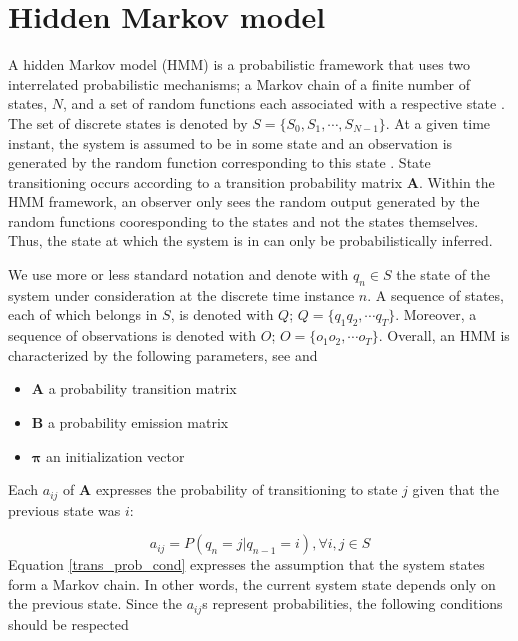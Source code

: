 \section{Hidden Markov model}
\label{hmm_general}

A hidden Markov model (HMM) is a probabilistic framework that uses two interrelated probabilistic mechanisms; a Markov chain of a finite
number of states, $N$, and a set of random functions each associated with a respective state \cite{koski}.  The set of discrete states is denoted by $S=\{S_0, S_1,\cdots, S_{N-1}\}$. At a given time instant, the 
system is assumed to be in some state and an observation is generated by the random function corresponding to this state  \cite{koski}.
State transitioning occurs according to a transition probability matrix  $\mathbf{A}$. Within  the HMM framework, an observer only sees the random output generated by the random functions cooresponding to the states and not the states themselves. Thus, the state at which the system is in can only be probabilistically inferred. 

We use more or less standard notation and denote with $q_n \in S$ the state of the system under consideration at the discrete time instance $n$. 
A sequence of states, each of which belongs in $S$, is denoted with $Q$; $Q=\{q_1q_2,\cdots q_T\}$. Moreover, a sequence of observations is denoted with $O$; $O=\{o_1o_2,\cdots o_T\}$. Overall, an HMM is characterized by the following parameters, see \cite{rabiner2009} and \cite{koski}

\begin{itemize}
	\item $\mathbf{A}$ a probability transition matrix
	\item $\mathbf{B}$ a probability emission matrix
	\item $\boldsymbol{\pi}$ an initialization vector
\end{itemize}
Each $a_{ij}$ of $\mathbf{A}$  expresses the probability of transitioning to state $j$ given that the previous state was $i$:

\begin{equation}
a_{ij} = P(q_n = j | q_{n-1} = i), \forall i,j \in S
\label{trans_prob_cond}
\end{equation}
Equation \ref{trans_prob_cond} expresses the assumption that the system states form a Markov chain. In other words, the current system state depends only on the previous state.
Since the $a_{ij}$s represent probabilities, the following conditions should be respected \cite{koski}

